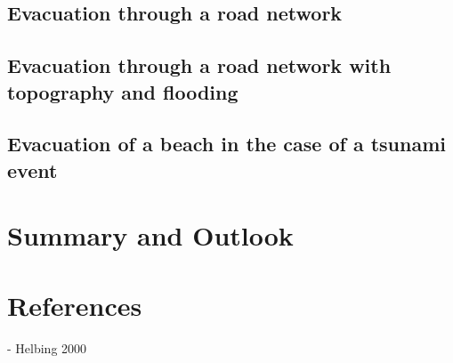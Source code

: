 \documentclass[11pt]{article}
\begin{document}
\subsection{Evacuation through a road network}
\subsection{Evacuation through a road network with topography and flooding}
\subsection{Evacuation of a beach in the case of a tsunami event}

\section{Summary and Outlook}

\section{References}

- Helbing 2000
\end{document}
